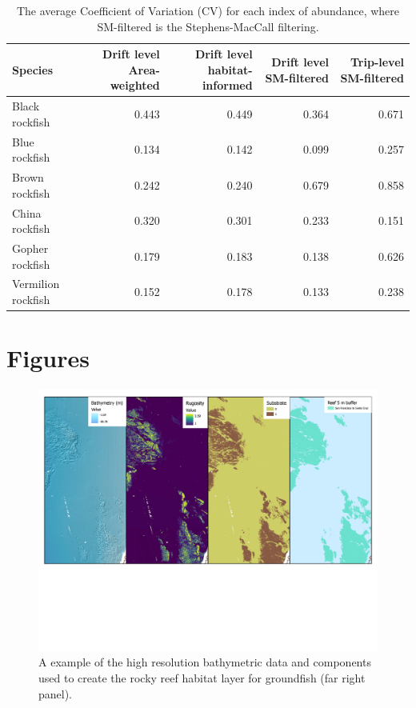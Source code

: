 \documentclass[
  12pt,
  authoryear,
  preprint,
  3p]{elsarticle}
\begin{document}
\begin{table}

\caption{The average Coefficient of Variation (CV) for 
                  each index of abundance, where SM-filtered is the 
                  Stephens-MacCall filtering.}
\centering
\begin{tabular}[t]{lrrrr}
\toprule
Species & Drift level Area-weighted & Drift level habitat-informed & Drift level SM-filtered & Trip-level SM-filtered\\
\midrule
Black rockfish & 0.443 & 0.449 & 0.364 & 0.671\\
Blue rockfish & 0.134 & 0.142 & 0.099 & 0.257\\
Brown rockfish & 0.242 & 0.240 & 0.679 & 0.858\\
China rockfish & 0.320 & 0.301 & 0.233 & 0.151\\
Gopher rockfish & 0.179 & 0.183 & 0.138 & 0.626\\
\addlinespace
Vermilion rockfish & 0.152 & 0.178 & 0.133 & 0.238\\
\bottomrule
\end{tabular}
\end{table}

\FloatBarrier

\hypertarget{figures}{%
\section{Figures}\label{figures}}

\begin{figure}

{\centering \includegraphics{figures/map_2.jpg}

}

\caption{\label{fig-map2}A example of the high resolution bathymetric
data and components used to create the rocky reef habitat layer for
groundfish (far right panel).}

\end{figure}
\end{document}

